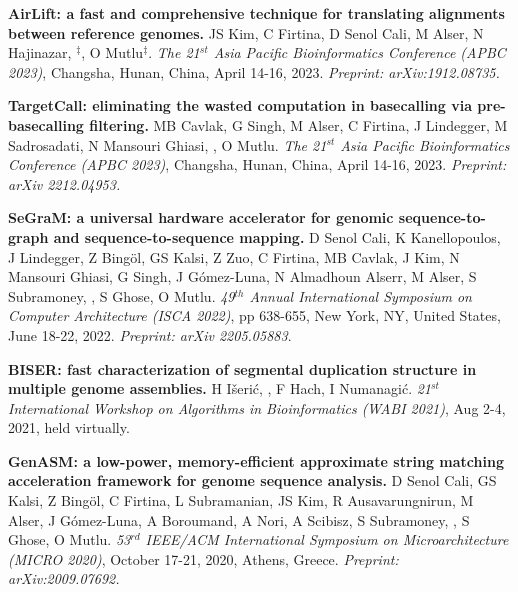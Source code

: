 

\vspace{-.2cm}
{\bf AirLift: a fast and comprehensive technique for translating alignments between reference genomes.} JS Kim, C Firtina, D Senol Cali, M Alser, N Hajinazar, \calkan{}$^\ddag$, O Mutlu$^\ddag$. {\em The 21$^{st}$ Asia Pacific Bioinformatics Conference (APBC 2023)}, Changsha, Hunan, China, April 14-16, 2023.  \textit{Preprint: arXiv:1912.08735.}

\vspace{-.2cm}
{\bf TargetCall: eliminating the wasted computation in basecalling via pre-basecalling filtering.}  
MB Cavlak, G Singh, M Alser, C Firtina, J Lindegger, M Sadrosadati, N Mansouri Ghiasi, \calkan{}, O Mutlu. {\em The 21$^{st}$ Asia Pacific Bioinformatics Conference (APBC 2023)}, Changsha, Hunan, China, April 14-16, 2023.
\textit{Preprint: arXiv 2212.04953.}

\vspace{-.2cm}
{\bf 
SeGraM: a universal hardware accelerator for genomic sequence-to-graph and sequence-to-sequence mapping.} 
D Senol Cali, K Kanellopoulos, J Lindegger, Z Bingöl, GS Kalsi, Z Zuo, C Firtina, MB Cavlak, J Kim, N Mansouri Ghiasi, G Singh, J Gómez-Luna, N Almadhoun Alserr, M Alser, S Subramoney, \calkan{}, S Ghose, O Mutlu.
{\em 49$^{th}$ Annual International Symposium on Computer Architecture (ISCA 2022)}, pp 638-655, New York, NY, United States, June 18-22, 2022.
\textit{Preprint: arXiv 2205.05883}.


\vspace{-.2cm}
{\bf BISER: fast characterization of segmental
duplication structure in multiple genome assemblies.} H  Išerić, \calkan{}, F Hach, I Numanagić. 
{\em 21$^{st}$ International Workshop on Algorithms in Bioinformatics (WABI 2021)}, Aug 2-4, 2021, held virtually. 

\vspace{-.2cm}
{\bf GenASM: a low-power, memory-efficient approximate string matching acceleration framework for genome sequence analysis.}
D Senol Cali, GS Kalsi, Z Bingöl, C Firtina, L Subramanian,  JS Kim, R Ausavarungnirun, M Alser,
 J Gómez-Luna, A Boroumand, A Nori, A Scibisz, S Subramoney, \calkan{}, S Ghose, O Mutlu.
{\em 53$^{rd}$ IEEE/ACM International Symposium on Microarchitecture (MICRO 2020)}, October 17-21, 2020, Athens, Greece. \textit{Preprint: arXiv:2009.07692.}


